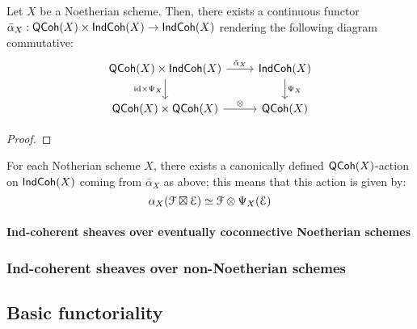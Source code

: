                     \begin{proposition} \label{prop: canonical_action_of_qcoh_on_indcoh}
                        Let $X$ be a Noetherian scheme. Then, there exists a continuous functor $\bar{\alpha}_X: \QCoh(X) \x \Ind\Coh(X) \to \Ind\Coh(X)$ rendering the following diagram commutative:
                            $$
                                \begin{tikzcd}
                                	{\QCoh(X) \x \Ind\Coh(X)} & {\Ind\Coh(X)} \\
                                	{\QCoh(X) \x \QCoh(X)} & {\QCoh(X)}
                                	\arrow["{\id \x \Psi_X}"', from=1-1, to=2-1]
                                	\arrow["\tensor", from=2-1, to=2-2]
                                	\arrow["{\bar{\alpha}_X}", from=1-1, to=1-2]
                                	\arrow["{\Psi_X}", from=1-2, to=2-2]
                                \end{tikzcd}
                            $$
                    \end{proposition}
                        \begin{proof}
                            
                        \end{proof}
                    \begin{corollary} \label{coro: canonical_action_of_qcoh_on_indcoh}
                        For each Notherian scheme $X$, there exists a canonically defined $\mathsf{QCoh}(X)$-action on $\mathsf{Ind}\mathsf{Coh}(X)$ coming from $\bar{\alpha}_X$ as above; this means that this action is given by:
                            $$\alpha_X(\calF \boxtimes \E) \cong \calF \tensor \Psi_X(\E)$$
                    \end{corollary}
                
                \paragraph{Ind-coherent sheaves over eventually coconnective Noetherian schemes}
                
            \subsubsection{Ind-coherent sheaves over non-Noetherian schemes}
            
        \subsection{Basic functoriality}
